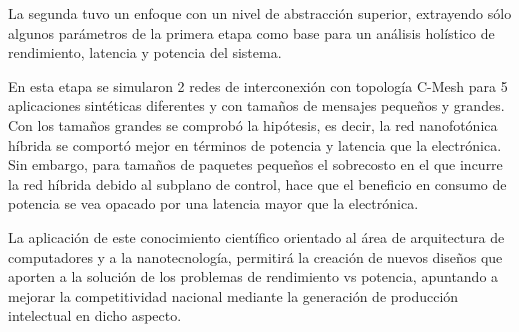La segunda tuvo un enfoque con un nivel de abstracción superior, extrayendo
sólo algunos parámetros de la primera etapa como base para un análisis holístico de rendimiento,
latencia y potencia del sistema.

En esta etapa se simularon 2 redes de interconexión con topología C-Mesh para 5 aplicaciones
sintéticas diferentes y con tamaños de mensajes pequeños y grandes. Con los tamaños grandes
se comprobó la hipótesis, es decir, la red nanofotónica híbrida se comportó mejor en
términos de potencia y latencia que la electrónica. Sin embargo, para tamaños de paquetes
pequeños el sobrecosto en el que incurre la red híbrida debido al subplano de control,
hace que el beneficio en consumo de potencia se vea opacado por una latencia mayor
que la electrónica.

La aplicación de este conocimiento 
científico orientado al área de arquitectura de computadores y a la nanotecnología, 
permitirá la creación de nuevos diseños que aporten a la solución de los
problemas de rendimiento vs potencia, apuntando a mejorar la competitividad 
nacional mediante la generación de producción intelectual en dicho aspecto.

\begin{comment}
En este proyecto se evalúa el comportamiento de los elementos básicos que conforman
los dispositivos fotónicos. Esta caracterización a nivel físico, permite tener un
mayor control sobre los parámetros con los que se simula su comportamiento a nivel
de un sistema completo en una capa de abstracción superior.

También se analizan diferentes diseños de 
arquitecturas que permiten analizar el impacto de las NoCs ópticas en 
las futuras generaciones de CMPs. 

Este impacto es de vital importancia para 
lograr el aumento en el rendimiento manteniendo al mismo tiempo la eficiencia 
en el consumo de potencia.

Al finalizar, se tendrán los análsis comparativos en términos de ancho de banda, 
potencia y latencia de algunas de las redes de interconexión más conocidas 
sobre diferentes conjuntos de pruebas. La aplicación de este conocimiento 
científico orientado al área de arquitectura de computadores y a la nanotecnología, 
permitirá la creación de nuevos diseños que aporten a la solución de los
problemas de rendimiento vs potencia, apuntando a mejorar la competitividad 
nacional mediante la generación de producción intelectual en dicho aspecto.
\end{comment}

